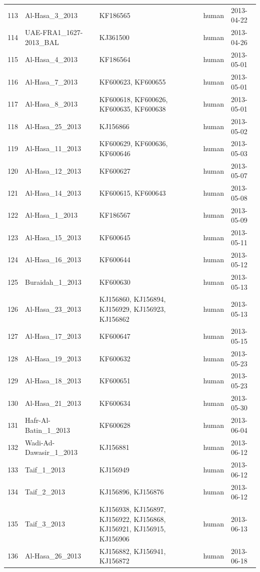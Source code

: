 \documentclass[9pt,lineno]{elife}
\begin{document}
\begin{longtable}{ | r | l | p{2cm} | l | l | }
  113 & Al-Hasa\_3\_2013 & KF186565 & human & 2013-04-22 \\
  114 & UAE-FRA1\_1627-2013\_BAL & KJ361500 & human & 2013-04-26 \\
  115 & Al-Hasa\_4\_2013 & KF186564 & human & 2013-05-01 \\
  116 & Al-Hasa\_7\_2013 & KF600623, KF600655 & human & 2013-05-01 \\
  117 & Al-Hasa\_8\_2013 & KF600618, KF600626, KF600635, KF600638 & human & 2013-05-01 \\
  118 & Al-Hasa\_25\_2013 & KJ156866 & human & 2013-05-02 \\
  119 & Al-Hasa\_11\_2013 & KF600629, KF600636, KF600646 & human & 2013-05-03 \\
  120 & Al-Hasa\_12\_2013 & KF600627 & human & 2013-05-07 \\
  121 & Al-Hasa\_14\_2013 & KF600615, KF600643 & human & 2013-05-08 \\
  122 & Al-Hasa\_1\_2013 & KF186567 & human & 2013-05-09 \\
  123 & Al-Hasa\_15\_2013 & KF600645 & human & 2013-05-11 \\
  124 & Al-Hasa\_16\_2013 & KF600644 & human & 2013-05-12 \\
  125 & Buraidah\_1\_2013 & KF600630 & human & 2013-05-13 \\
  126 & Al-Hasa\_23\_2013 & KJ156860, KJ156894, KJ156929, KJ156923, KJ156862 & human & 2013-05-13 \\
  127 & Al-Hasa\_17\_2013 & KF600647 & human & 2013-05-15 \\
  128 & Al-Hasa\_19\_2013 & KF600632 & human & 2013-05-23 \\
  129 & Al-Hasa\_18\_2013 & KF600651 & human & 2013-05-23 \\
  130 & Al-Hasa\_21\_2013 & KF600634 & human & 2013-05-30 \\
  131 & Hafr-Al-Batin\_1\_2013 & KF600628 & human & 2013-06-04 \\
  132 & Wadi-Ad-Dawasir\_1\_2013 & KJ156881 & human & 2013-06-12 \\
  133 & Taif\_1\_2013 & KJ156949 & human & 2013-06-12 \\
  134 & Taif\_2\_2013 & KJ156896, KJ156876 & human & 2013-06-12 \\
  135 & Taif\_3\_2013 & KJ156938, KJ156897, KJ156922, KJ156868, KJ156921, KJ156915,
KJ156906 & human & 2013-06-13 \\
  136 & Al-Hasa\_26\_2013 & KJ156882, KJ156941, KJ156872 & human & 2013-06-18 \\

\end{longtable}
\end{document}
